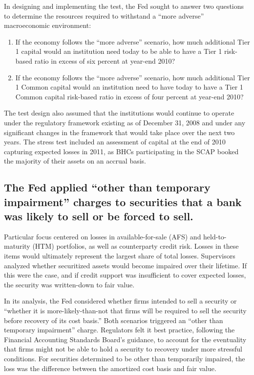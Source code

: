 \documentclass[12pt]{article}
\begin{document}
In designing and implementing the test, the Fed sought to answer two
questions to determine the resources required to withstand a ``more
adverse'' macroeconomic environment:

\begin{enumerate}
\def\labelenumi{\arabic{enumi}.}
\item
  If the economy follows the ``more adverse'' scenario, how much
  additional Tier 1 capital would an institution need today to be able
  to have a Tier 1 risk-based ratio in excess of six percent at year-end
  2010?
\item
  If the economy follows the ``more adverse'' scenario, how much
  additional Tier 1 Common capital would an institution need to have
  today to have a Tier 1 Common capital risk-based ratio in excess of
  four percent at year-end 2010?
\end{enumerate}

The test design also assumed that the institutions would continue to
operate under the regulatory framework existing as of December 31, 2008
and under any significant changes in the framework that would take place
over the next two years. The stress test included an assessment of
capital at the end of 2010 capturing expected losses in 2011, as BHCs
participating in the SCAP booked the majority of their assets on an
accrual basis.\citep{Design}

\subsection{The Fed applied ``other than temporary impairment'' charges to
securities that a bank was likely to sell or be forced to
sell.}

Particular focus centered on losses in available-for-sale (AFS) and
held-to-maturity (HTM) portfolios, as well as counterparty credit risk.
Losses in these items would ultimately represent the largest share of
total losses. Supervisors analyzed whether securitized assets would
become impaired over their lifetime. If this were the case, and if
credit support was insufficient to cover expected losses, the security
was written-down to fair value.

In its analysis, the Fed considered whether firms intended to sell a
security or ``whether it is more-likely-than-not that firms will be
required to sell the security before recovery of its cost basis.'' Both
scenarios triggered an ``other than temporary impairment'' charge.
Regulators felt it best practice, following the Financial Accounting
Standards Board's guidance, to account for the eventuality that firms
might not be able to hold a security to recovery under more stressful
conditions. For securities determined to be other than temporarily
impaired, the loss was the difference between the amortized cost basis
and fair value.\citep{Results}
\end{document}

